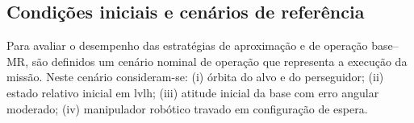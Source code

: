 \subsection{Condições iniciais e cenários de referência}
\label{sec:condicoes_iniciais_cenarios}

Para avaliar o desempenho das estratégias de aproximação e de operação base--MR, são definidos um cenário nominal de operação que representa a execução da missão.
Neste cenário consideram-se:
(i) órbita do alvo e do perseguidor;
(ii) estado relativo inicial em \gls{lvlh};
(iii) atitude inicial da base com erro angular moderado;
(iv) manipulador robótico travado em configuração de espera.